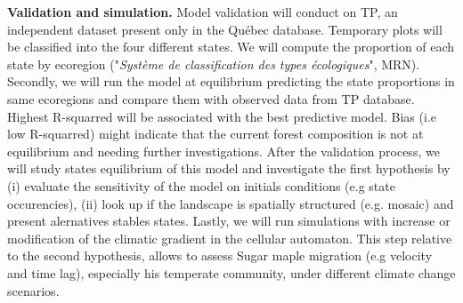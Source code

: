 \textbf{Validation and simulation.} Model validation will conduct on TP, an
independent dataset present only in the Québec database. Temporary plots will
be classified into the four different states. We will compute the proportion
of each state by ecoregion ("\textit{Système de classification des types
écologiques}", MRN). Secondly, we will run the model at equilibrium predicting
the state proportions in same ecoregions and compare them with observed data
from TP database. Highest R-squarred will be associated with the best
predictive model. Bias (i.e low R-squarred) might indicate that the current
forest composition is not at equilibrium and needing further investigations.
After the validation process, we will study states equilibrium of this model
and investigate the first hypothesis by (i) evaluate the sensitivity of the
model on initials conditions (e.g state occurencies), (ii) look up if the
landscape is spatially structured (e.g. mosaic) and present
alernatives stables states. Lastly, we will run simulations with increase or
modification of the climatic gradient in the cellular automaton. This step
relative to the second hypothesis, allows to assess Sugar maple migration (e.g
velocity and time lag), especially his temperate community, under different
climate change scenarios. 


\clearpage
\small

